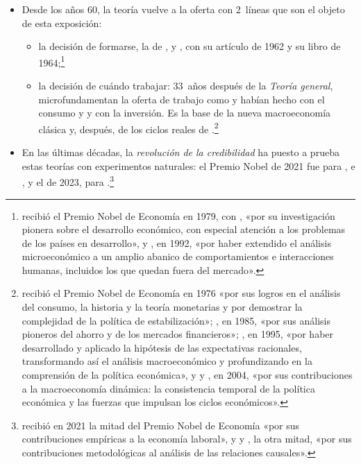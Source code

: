 \documentclass[11pt]{article}
\begin{document}
\begin{itemize}
\begin{itemize}
\begin{itemize}
\begin{itemize}
    \end{itemize}
  \item Desde los años 60, la teoría vuelve a la oferta con 2~líneas que son el objeto de esta exposición:
    \begin{itemize}
    \item la decisión de formarse, la  de \textcite{Mincer1958Investment}, \textcite{Schultz1961Investment} y , con su artículo de 1962 y su libro de 1964\nocite{Becker1962Investment,Becker1964Human};\footnote{ recibió el Premio Nobel de Economía en 1979, con , «por su investigación pionera sobre el desarrollo económico, con especial atención a los problemas de los países en desarrollo»\nocite{NobelPrize1979}, y , en 1992, «por haber extendido el análisis microeconómico a un amplio abanico de comportamientos e interacciones humanas, incluidos los que quedan fuera del mercado»\nocite{Nobel1992Becker}.}
    \item la decisión de cuándo trabajar: 33~años después de la \emph{Teoría general}, \textcite{LucasRapping1969Real} microfundamentan la oferta de trabajo como  y  habían hecho con el consumo y  y  con la inversión. Es la base de la nueva macroeconomía clásica y, después, de los ciclos reales de \textcite{KydlandPrescott1982Time}.\footnote{ recibió el Premio Nobel de Economía en 1976 «por sus logros en el análisis del consumo, la historia y la teoría monetarias y por demostrar la complejidad de la política de estabilización»\nocite{Nobel1976Friedman}; , en 1985, «por sus análisis pioneros del ahorro y de los mercados financieros»\nocite{Nobel1985Modigliani}; , en 1995, «por haber desarrollado y aplicado la hipótesis de las expectativas racionales, transformando así el análisis macroeconómico y profundizando en la comprensión de la política económica»\nocite{Nobel1995Lucas}, y  y , en 2004, «por sus contribuciones a la macroeconomía dinámica: la consistencia temporal de la política económica y las fuerzas que impulsan los ciclos económicos»\nocite{Nobel2004KydlandPrescott}.}
    \end{itemize}
  \item En las últimas décadas, la \emph{revolución de la credibilidad} ha puesto a prueba estas teorías con experimentos naturales: el Premio Nobel de 2021 fue para ,  e , y el de 2023, para .\footnote{ recibió en 2021 la mitad del Premio Nobel de Economía «por sus contribuciones empíricas a la economía laboral», y  y , la otra mitad, «por sus contribuciones metodológicas al análisis de las relaciones causales»\nocite{Nobel2021}.}
  \end{itemize}
  \end{itemize}


\end{itemize}
\end{document}

